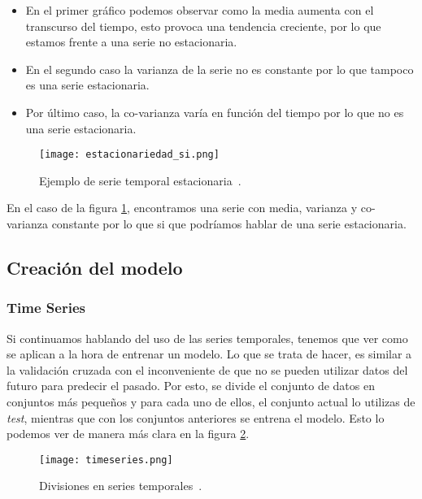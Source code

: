 \begin{itemize}
	\item En el primer gráfico podemos observar como la media aumenta con el transcurso del tiempo, esto provoca una tendencia creciente, por lo que estamos frente a una serie no estacionaria.
	\item En el segundo caso la varianza de la serie no es constante por lo que tampoco es una serie estacionaria.
	\item Por último caso, la co-varianza varía en función del tiempo por lo que no es una serie estacionaria. 
\end{itemize}

\begin{figure}%
	\centering
	\texttt{[image: estacionariedad\_si.png]}
	\caption[Ejemplo de serie temporal estacionaria]{Ejemplo de serie temporal estacionaria~\cite{SeriesTempIMG}.}\label{serie_si_estacionaria}
\end{figure}

En el caso de la figura \ref{serie_si_estacionaria}, encontramos una serie con media, varianza y co-varianza constante por lo que si que podríamos hablar de una serie estacionaria. 

\subsection{Creación del modelo}

\subsubsection{Time Series}\label{series_temporales_titutlo}
Si continuamos hablando del uso de las series temporales, tenemos que ver como se aplican a la hora de entrenar un modelo. Lo que se trata de hacer, es similar a la validación cruzada con el inconveniente de que no se pueden utilizar datos del futuro para predecir el pasado. Por esto, se divide el conjunto de datos en conjuntos más pequeños y para cada uno de ellos, el conjunto actual lo utilizas de \emph{test}, mientras que con los conjuntos anteriores se entrena el modelo. Esto lo podemos ver de manera más clara en la figura \ref{timeseriesimage}.

\begin{figure}%
	\centering
	\texttt{[image: timeseries.png]}
	\caption[Divisiones en series temporales]{Divisiones en series temporales~\cite{timeseriesimage}.}\label{timeseriesimage}
\end{figure}

